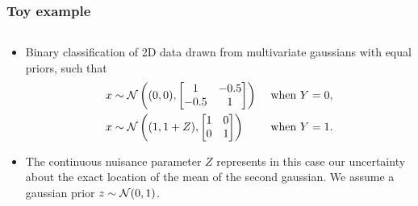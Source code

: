 \documentclass{beamer}
\begin{document}
\begin{frame}
    \frametitle{Toy example}

    \begin{columns}[t]
        \begin{column}{0.8\textwidth}
            \begin{itemize}
                \item Binary classification of 2D
               data drawn from multivariate gaussians with equal priors, such that
               {\scriptsize
               \begin{align*}
                   x &\sim {\cal N}\left ((0,0), \begin{bmatrix}
                                             1 & -0.5 \\
                                             -0.5 & 1
                                           \end{bmatrix}\right) &\text{ when } Y=0, \\
                   x &\sim {\cal N}\left ((1,1+Z),  \begin{bmatrix}
                                             1 & 0 \\
                                             0 & 1
                                            \end{bmatrix}\right) &\text{ when } Y=1.
               \end{align*}}
               \item The continuous nuisance parameter $Z$ represents in this case our
               uncertainty about the exact location of the mean of the second gaussian.
               We assume a gaussian prior $z \sim {\cal N}(0,1)$.


\end{itemize}
\end{column}
\end{columns}
\end{frame}
\end{document}
